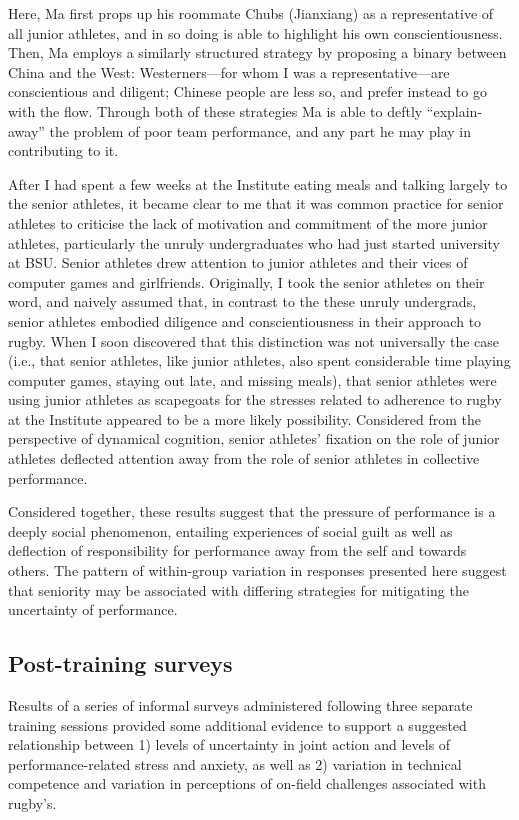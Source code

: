 \begin{CJK}{UTF8}{gbsn}
Here, Ma first props up his roommate Chubs (Jianxiang) as a representative of all junior athletes, and in so doing is able to highlight his own conscientiousness.  Then, Ma employs a similarly structured strategy by proposing a binary between China and the West: Westerners---for whom I was a representative---are conscientious and diligent; Chinese people are less so, and prefer instead to go with the flow.  Through both of these strategies Ma is able to deftly ``explain-away'' the problem of poor team performance, and any part he may play in contributing to it.

After I had spent a few weeks at the Institute eating meals and talking largely to the senior athletes, it became clear to me that it was common practice for senior athletes to criticise the lack of motivation and commitment of the more junior athletes, particularly the unruly undergraduates who had just started university at BSU.  Senior athletes drew attention to junior athletes and their vices of computer games and girlfriends.  Originally, I took the senior athletes on their word, and naively assumed that, in contrast to the these unruly undergrads, senior athletes embodied diligence and conscientiousness in their approach to rugby.  When I soon discovered that this distinction was not universally the case (i.e., that senior athletes, like junior athletes, also spent considerable time playing computer games, staying out late, and missing meals), that senior athletes were using junior athletes as scapegoats for the stresses related to adherence to rugby at the Institute appeared to be a more likely possibility.  Considered from the perspective of dynamical cognition, senior athletes' fixation on the role of junior athletes deflected attention away from the role of senior athletes in collective performance.

Considered together, these results suggest that the pressure of performance is a deeply social phenomenon, entailing experiences of social guilt as well as deflection of responsibility for performance away from the self and towards others.  The pattern of within-group variation in responses presented here suggest that seniority may be associated with differing strategies for mitigating the uncertainty of performance.



\subsection{Post-training surveys\label{sect:postTrainingSurvey}}
Results of a series of informal surveys administered following three separate training sessions provided some additional evidence to support a suggested relationship between 1) levels of uncertainty in joint action and levels of performance-related stress and anxiety, as well as 2) variation in technical competence and variation in perceptions of on-field challenges associated with rugby’s.


\end{CJK}
